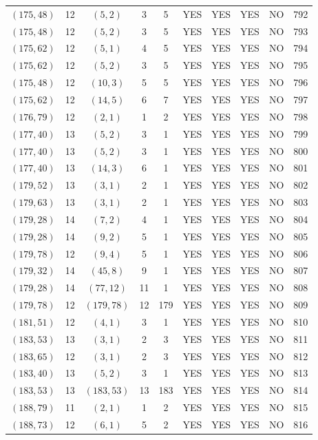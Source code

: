 \begin{longtable}{|c|c|c|c|c|c|c|c|c|c|}
$(175, 48)$ & 12 & $(5, 2)$ & 3 & 5 & YES & YES & YES & NO & 792\\
$(175, 48)$ & 12 & $(5, 2)$ & 3 & 5 & YES & YES & YES & NO & 793\\
$(175, 62)$ & 12 & $(5, 1)$ & 4 & 5 & YES & YES & YES & NO & 794\\
$(175, 62)$ & 12 & $(5, 2)$ & 3 & 5 & YES & YES & YES & NO & 795\\
$(175, 48)$ & 12 & $(10, 3)$ & 5 & 5 & YES & YES & YES & NO & 796\\
$(175, 62)$ & 12 & $(14, 5)$ & 6 & 7 & YES & YES & YES & NO & 797\\
$(176, 79)$ & 12 & $(2, 1)$ & 1 & 2 & YES & YES & YES & NO & 798\\
$(177, 40)$ & 13 & $(5, 2)$ & 3 & 1 & YES & YES & YES & NO & 799\\
$(177, 40)$ & 13 & $(5, 2)$ & 3 & 1 & YES & YES & YES & NO & 800\\
$(177, 40)$ & 13 & $(14, 3)$ & 6 & 1 & YES & YES & YES & NO & 801\\
$(179, 52)$ & 13 & $(3, 1)$ & 2 & 1 & YES & YES & YES & NO & 802\\
$(179, 63)$ & 13 & $(3, 1)$ & 2 & 1 & YES & YES & YES & NO & 803\\
$(179, 28)$ & 14 & $(7, 2)$ & 4 & 1 & YES & YES & YES & NO & 804\\
$(179, 28)$ & 14 & $(9, 2)$ & 5 & 1 & YES & YES & YES & NO & 805\\
$(179, 78)$ & 12 & $(9, 4)$ & 5 & 1 & YES & YES & YES & NO & 806\\
$(179, 32)$ & 14 & $(45, 8)$ & 9 & 1 & YES & YES & YES & NO & 807\\
$(179, 28)$ & 14 & $(77, 12)$ & 11 & 1 & YES & YES & YES & NO & 808\\
$(179, 78)$ & 12 & $(179, 78)$ & 12 & 179 & YES & YES & YES & NO & 809\\
$(181, 51)$ & 12 & $(4, 1)$ & 3 & 1 & YES & YES & YES & NO & 810\\
$(183, 53)$ & 13 & $(3, 1)$ & 2 & 3 & YES & YES & YES & NO & 811\\
$(183, 65)$ & 12 & $(3, 1)$ & 2 & 3 & YES & YES & YES & NO & 812\\
$(183, 40)$ & 13 & $(5, 2)$ & 3 & 1 & YES & YES & YES & NO & 813\\
$(183, 53)$ & 13 & $(183, 53)$ & 13 & 183 & YES & YES & YES & NO & 814\\
$(188, 79)$ & 11 & $(2, 1)$ & 1 & 2 & YES & YES & YES & NO & 815\\
$(188, 73)$ & 12 & $(6, 1)$ & 5 & 2 & YES & YES & YES & NO & 816\\

\end{longtable}
